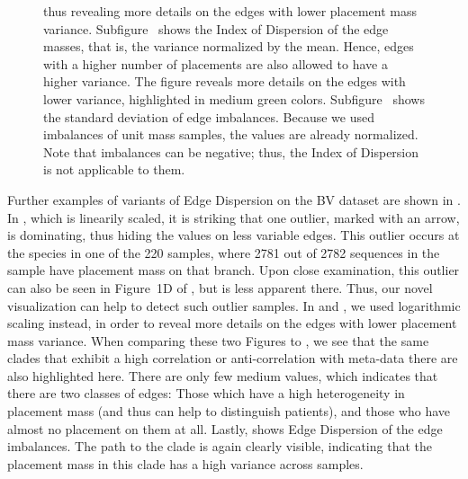 \begin{figure}[!htpb]
{        thus revealing more details on the edges with lower placement mass variance.
        Subfigure~
        shows the Index of Dispersion of the edge masses, that is, the variance normalized by the mean.
        Hence, edges with a higher number of placements are also allowed to have a higher variance.
        The figure reveals more details on the edges with lower variance, highlighted in medium green colors.
        Subfigure~
        shows the standard deviation of edge imbalances.
        Because we used imbalances of unit mass samples, the values are already normalized.
        Note that imbalances can be negative; thus, the Index of Dispersion is not applicable to them.
    }
    \label{fig:all_dispersions}
\end{figure}


Further examples of variants of Edge Dispersion on the \ac{BV} dataset are shown in .
In , which is linearily scaled,
it is striking that one outlier, marked with an arrow, is dominating, thus hiding the values on less variable edges.
This outlier occurs at the species  in one of the \num{220} samples,
where \num{2 781} out of \num{2 782} sequences in the sample have placement mass on that branch.
Upon close examination, this outlier can also be seen in Figure~1D of \cite{Srinivasan2012},
but is less apparent there.
Thus, our novel visualization can help to detect such outlier samples.
In  and ,
we used logarithmic scaling instead, in order to reveal more details on the edges with lower placement mass variance.
When comparing these two Figures to ,
we see that the same clades that exhibit a high correlation or anti-correlation with meta-data there
are also highlighted here.
There are only few medium values, which indicates that there are two classes of edges:
Those which have a high heterogeneity in placement mass (and thus can help to distinguish patients),
and those who have almost no placement on them at all.
Lastly,  shows Edge Dispersion of the edge imbalances.
The path to the  clade is again clearly visible,
indicating that the placement mass in this clade has a high variance across samples.

